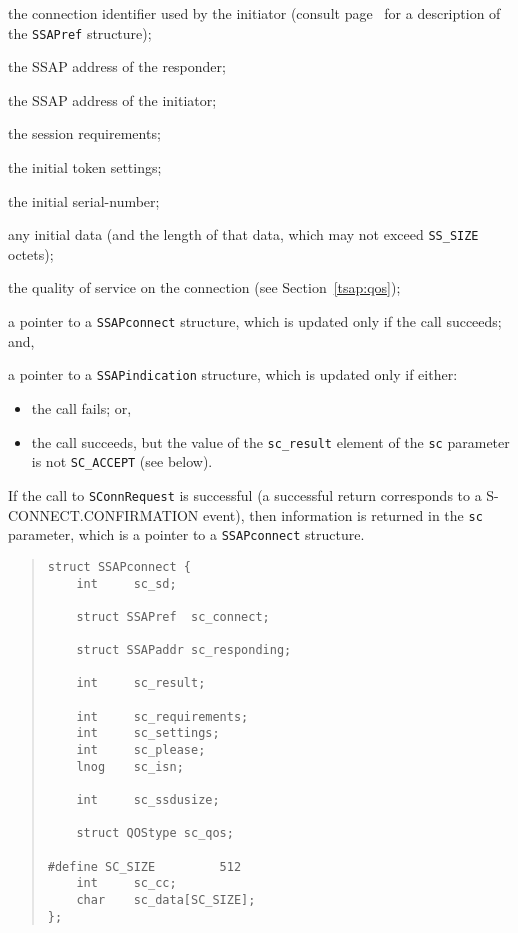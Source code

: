 \begin{describe}
\item[\verb"ref":] the connection identifier used by the initiator
(consult page~\pageref{SSAPref} for a description of the \verb"SSAPref"
structure);

\item[\verb"calling":] the SSAP address of the responder;

\item[\verb"called":] the SSAP address of the initiator;

\item[\verb"requirements":] the session requirements;

\item[\verb"settings":] the initial token settings;

\item[\verb"isn":] the initial serial-number;

\item[\verb"data"/\verb"cc":] any initial data (and the length of that data,
which may not exceed \verb"SS_SIZE" octets);

\item[\verb"qos":] the quality of service on the connection
(see Section~\ref{tsap:qos});

\item[\verb"sc":] a pointer to a \verb"SSAPconnect" structure, which is
updated only if the call succeeds;
and,

\item[\verb"si":] a pointer to a \verb"SSAPindication" structure, which is
updated only if either:
\begin{itemize}
\item the call fails;
or,

\item the call succeeds,
but the value of the \verb"sc_result" element of the \verb"sc" parameter
is not \verb"SC_ACCEPT" (see below).
\end{itemize}
\end{describe}
If the call to \verb"SConnRequest" is successful
(a successful return corresponds to a {\sf S-CONNECT.CONFIRMATION\/} event),
then information is returned in the \verb"sc" parameter,
which is a pointer to a \verb"SSAPconnect" structure.
\begin{quote}\small\begin{verbatim}
struct SSAPconnect {
    int     sc_sd;

    struct SSAPref  sc_connect;
    
    struct SSAPaddr sc_responding;

    int     sc_result;

    int     sc_requirements;
    int     sc_settings;
    int     sc_please;
    lnog    sc_isn;

    int     sc_ssdusize;

    struct QOStype sc_qos;

#define SC_SIZE         512
    int     sc_cc;
    char    sc_data[SC_SIZE];
};
\end{verbatim}\end{quote}
